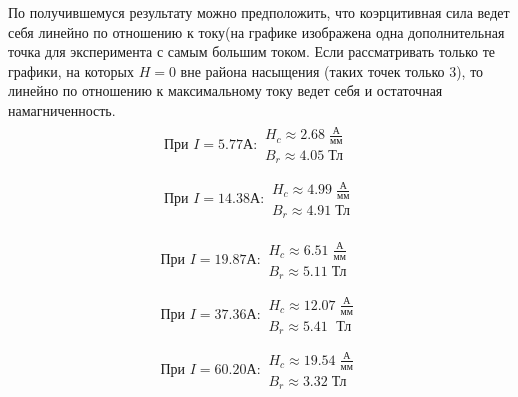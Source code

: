 \documentclass[a4paper,14pt]{extarticle}
\begin{document}
				По получившемуся результату можно предположить, что коэрцитивная сила ведет себя линейно по отношению к току(на графике изображена одна дополнительная точка для эксперимента с самым большим током. Если рассматривать только те графики, на которых $H = 0$ вне района насыщения (таких точек только 3), то линейно по отношению к максимальному току ведет себя и остаточная намагниченность.
				\newline
				\begin{equation}
					\begin{gathered}
				 		\text{При } I = 5.77 \text{А}:
						\begin{gathered}
							H_c\approx 2.68 \; \frac{\text{А}}{\text{мм}}\\
							B_r\approx 4.05 \; \text{Тл}
						\end{gathered}\\ \\
							\text{При } I = 14.38 \text{А}:
						\begin{gathered}
							H_c\approx 4.99 \; \frac{\text{А}}{\text{мм}}\\
							B_r\approx 4.91 \; \text{Тл}
						\end{gathered}\\ \\
					\end{gathered}
				\end{equation}
				\begin{equation}
					\begin{gathered}
							\text{При } I = 19.87 \text{А}:
						\begin{gathered}
							H_c\approx 6.51 \; \frac{\text{А}}{\text{мм}}\\
							B_r\approx 5.11 \; \text{Тл}
						\end{gathered}\\ \\
							\text{При } I = 37.36 \text{А}:
						\begin{gathered}
							H_c\approx 12.07 \; \frac{\text{А}}{\text{мм}}\\
							B_r\approx 5.41 \; \text{ Тл}
						\end{gathered}\\ \\
							\text{При } I = 60.20 \text{А}:
						\begin{gathered}
							H_c\approx 19.54 \; \frac{\text{А}}{\text{мм}}\\
							B_r\approx 3.32 \; \text{Тл}
						\end{gathered}\\ \\
					\end{gathered}
				\end{equation}
\end{document}
